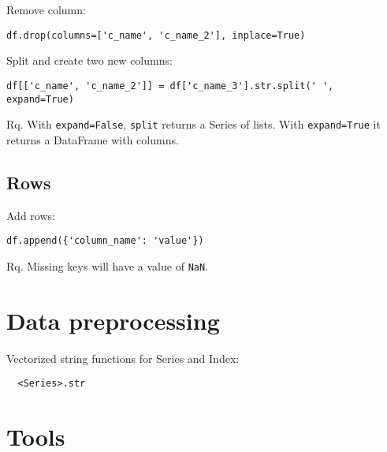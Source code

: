 \documentclass[french]{article}
\begin{document}
Remove column:
\begin{verbatim}
df.drop(columns=['c_name', 'c_name_2'], inplace=True)
\end{verbatim}

Split and create two new columns:
\begin{verbatim}
df[['c_name', 'c_name_2']] = df['c_name_3'].str.split(' ', expand=True)
\end{verbatim}
Rq. With \verb|expand=False|, \verb|split| returns a Series of lists. With \verb|expand=True| it returns a DataFrame with columns.

\subsection{Rows}

Add rows:
\begin{verbatim}
df.append({'column_name': 'value'})
\end{verbatim}
Rq. Missing keys will have a value of \verb|NaN|.


\section{Data preprocessing}

Vectorized string functions for Series and Index:
\begin{verbatim}
  <Series>.str
\end{verbatim}

\section{Tools}
\end{document}
